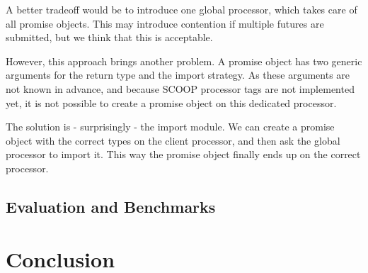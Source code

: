 \documentclass[a4paper,10pt]{report}
\begin{document}
A better tradeoff would be to introduce one global processor, which takes care of all promise objects.
This may introduce contention if multiple futures are submitted, but we think that this is acceptable.

However, this approach brings another problem.
A promise object has two generic arguments for the return type and the import strategy.
As these arguments are not known in advance, and because SCOOP processor tags  are not implemented yet, it is not possible to create a promise object on this dedicated processor.

The solution is - surprisingly - the import module.
We can create a promise object with the correct types on the client processor, and then ask the global processor to import it.
This way the promise object finally ends up on the correct processor.





\subsection{Evaluation and Benchmarks}


\section{Conclusion}

\todos
\end{document}
